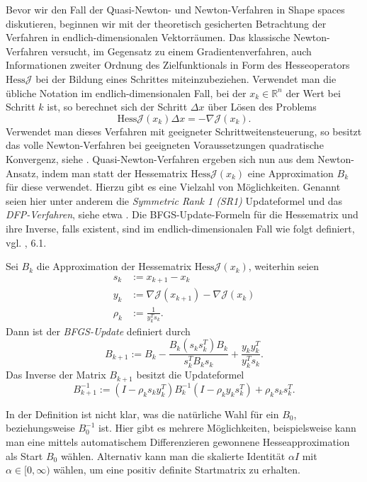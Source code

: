 Bevor wir den Fall der Quasi-Newton- und Newton-Verfahren in Shape spaces diskutieren, beginnen wir mit der theoretisch gesicherten Betrachtung der Verfahren in endlich-dimensionalen Vektorräumen. Das klassische Newton-Verfahren versucht, im Gegensatz zu einem Gradientenverfahren, auch Informationen zweiter Ordnung des Zielfunktionals in Form des Hesseoperators $\text{Hess} \mathcal{J}$ bei der Bildung eines Schrittes miteinzubeziehen. Verwendet man die übliche Notation im endlich-dimensionalen Fall, bei der $x_k \in \mathbb{R}^n$ der Wert bei Schritt $k$ ist, so berechnet sich der Schritt $\Delta x$ über Lösen des Problems
\begin{equation}\label{newtonfinite}
	\text{Hess} \mathcal{J} (x_k)\Delta x = - \nabla \mathcal{J}(x_k).
\end{equation}
Verwendet man dieses Verfahren mit geeigneter Schrittweitensteuerung, so besitzt das volle Newton-Verfahren bei geeigneten Voraussetzungen quadratische Konvergenz, siehe \cite{Nocedal}. Quasi-Newton-Verfahren ergeben sich nun aus dem Newton-Ansatz, indem man statt der Hessematrix $\text{Hess}\mathcal{J}(x_k)$ eine Approximation $B_k$ für diese verwendet. Hierzu gibt es eine Vielzahl von Möglichkeiten. Genannt seien hier unter anderem die \textit{Symmetric Rank 1 (SR1)} Updateformel und das \textit{DFP-Verfahren}, siehe etwa \cite{Nocedal}. Die BFGS-Update-Formeln für die Hessematrix und ihre Inverse, falls existent, sind im endlich-dimensionalen Fall wie folgt definiert, vgl. \cite{Nocedal}, 6.1.

\begin{defi}\label{BFGS-updates}	
	Sei $B_k$ die Approximation der Hessematrix $\text{Hess}\mathcal{J}(x_k)$, weiterhin seien 
	\begin{align*}
		s_k &:= x_{k+1} - x_k \\ y_k &:= \nabla \mathcal{J}(x_{k+1}) - \nabla \mathcal{J}(x_k) \\ \rho_k &:= \frac{1}{y_k^T s_k }.
	\end{align*}
	Dann ist der \textit{BFGS-Update} definiert durch
	\begin{equation}
		B_{k+1} := B_k - \frac{B_k (s_k s_k^T) B_k}{s_k^T B_k s_k} + \frac{y_k y_k^T}{y_k^T s_k}.
	\end{equation}
	Das Inverse der Matrix $B_{k+1}$ besitzt die Updateformel
	\begin{equation}
		B_{k+1}^{-1} := (I - \rho_k s_k y_k^T)B_k^{-1}(I - \rho_k y_k s_k^T) + \rho_k s_k s_k^T.
	\end{equation}
\end{defi}
In der Definition ist nicht klar, was die natürliche Wahl für ein $B_0$, beziehungsweise $B_0^{-1}$ ist. Hier gibt es mehrere Möglichkeiten, beispielsweise kann man eine mittels automatischem Differenzieren gewonnene Hesseapproximation als Start $B_0$ wählen. Alternativ kann man die skalierte Identität $\alpha I$ mit $\alpha \in [0,\infty)$ wählen, um eine positiv definite Startmatrix zu erhalten.

